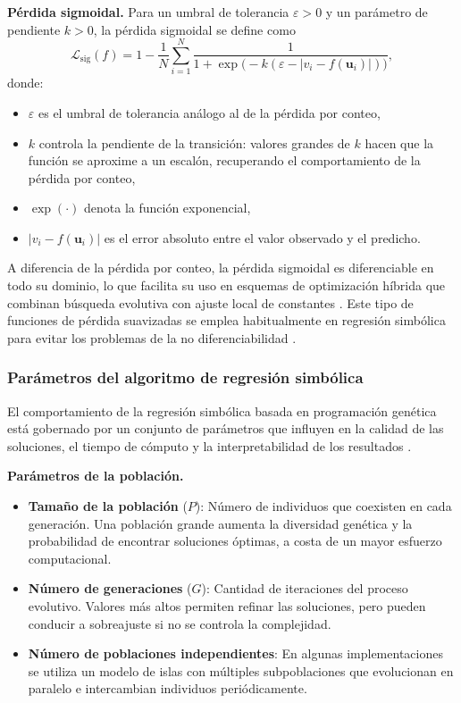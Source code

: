 \documentclass[12pt,a4paper]{article}
\newcommand{\loss}{\mathcal{L}}
\begin{document}
\textbf{Pérdida sigmoidal.} Para un umbral de tolerancia \(\varepsilon > 0\) y un parámetro de pendiente \(k > 0\), la pérdida sigmoidal se define como
\begin{equation}
    \loss_{\text{sig}}(f) = 1 - \frac{1}{N} \sum_{i=1}^{N} \frac{1}{1 + \exp\bigl( -k (\varepsilon - |v_i - f(\mathbf{u}_i)|) \bigr)},
\end{equation}
donde:
\begin{itemize}
    \item \(\varepsilon\) es el umbral de tolerancia análogo al de la pérdida por conteo,
    \item \(k\) controla la pendiente de la transición: valores grandes de \(k\) hacen que la función se aproxime a un escalón, recuperando el comportamiento de la pérdida por conteo,
    \item \(\exp(\cdot)\) denota la función exponencial,
    \item \(|v_i - f(\mathbf{u}_i)|\) es el error absoluto entre el valor observado y el predicho.
\end{itemize}
A diferencia de la pérdida por conteo, la pérdida sigmoidal es diferenciable en todo su dominio, lo que facilita su uso en esquemas de optimización híbrida que combinan búsqueda evolutiva con ajuste local de constantes \cite{cranmer2023pysr}. Este tipo de funciones de pérdida suavizadas se emplea habitualmente en regresión simbólica para evitar los problemas de la no diferenciabilidad \cite{schmidt2009distilling}.

\subsubsection*{Parámetros del algoritmo de regresión simbólica}

El comportamiento de la regresión simbólica basada en programación genética está gobernado por un conjunto de parámetros que influyen en la calidad de las soluciones, el tiempo de cómputo y la interpretabilidad de los resultados \cite{koza1992genetic}.

\textbf{Parámetros de la población.}
\begin{itemize}
    \item \textbf{Tamaño de la población} (\(P\)): Número de individuos que coexisten en cada generación. Una población grande aumenta la diversidad genética y la probabilidad de encontrar soluciones óptimas, a costa de un mayor esfuerzo computacional.
    \item \textbf{Número de generaciones} (\(G\)): Cantidad de iteraciones del proceso evolutivo. Valores más altos permiten refinar las soluciones, pero pueden conducir a sobreajuste si no se controla la complejidad.
    \item \textbf{Número de poblaciones independientes}: En algunas implementaciones se utiliza un modelo de islas con múltiples subpoblaciones que evolucionan en paralelo e intercambian individuos periódicamente.
\end{itemize}
\end{document}
